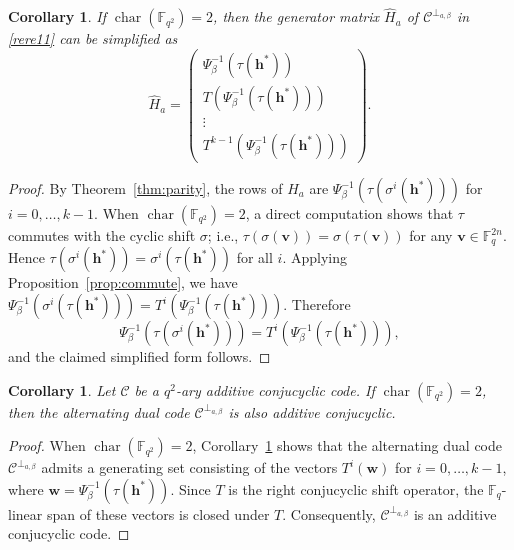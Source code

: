 \documentclass{aims}
\numberwithin{equation}{section}
\newtheorem{corollary}[theorem]{Corollary}
\theoremstyle{definition}
\newcommand{\F}{\mathbb{F}}
\newcommand{\charac}{\operatorname{char}}
\begin{document}
\begin{corollary}\label{rere113}
	If $\charac(\F_{q^2}) = 2$, then the generator matrix $\hat{H}_a$ of $\mathcal{C}^{\perp_{a,\beta}}$ in \eqref{rere11} can be simplified as
	\[
	\hat{H}_a = \begin{pmatrix}
		\Psi_\beta^{-1}(\tau(\pmb{h^*})) \\
		T(\Psi_\beta^{-1}(\tau(\pmb{h^*}))) \\
		\vdots \\
		T^{k-1}(\Psi_\beta^{-1}(\tau(\pmb{h^*})))
	\end{pmatrix}.
	\]
\end{corollary}
\begin{proof}
	By Theorem~\ref{thm:parity}, the rows of $\hat{H}_a$ are $\Psi_\beta^{-1}(\tau(\sigma^i(\pmb{h^*})))$ for $i = 0,\dots,k-1$. When $\charac(\F_{q^2}) = 2$, a direct computation shows that $\tau$ commutes with the cyclic shift $\sigma$; i.e., $\tau(\sigma(\mathbf{v})) = \sigma(\tau(\mathbf{v}))$ for any $\mathbf{v}\in\F_q^{2n}$. Hence $\tau(\sigma^i(\pmb{h^*})) = \sigma^i(\tau(\pmb{h^*}))$ for all $i$. Applying Proposition~\ref{prop:commute}, we have $\Psi_\beta^{-1}(\sigma^i(\tau(\pmb{h^*}))) = T^i(\Psi_\beta^{-1}(\tau(\pmb{h^*})))$. Therefore
	\[
	\Psi_\beta^{-1}(\tau(\sigma^i(\pmb{h^*}))) = T^i(\Psi_\beta^{-1}(\tau(\pmb{h^*}))),
	\]
	and the claimed simplified form follows.
\end{proof}

\begin{corollary}\label{cor:char2}
	Let $\mathcal{C}$ be a $q^2$-ary additive conjucyclic code. If $\charac(\F_{q^2}) = 2$, then the alternating dual code $\mathcal{C}^{\perp_{a,\beta}}$ is also additive conjucyclic.
\end{corollary}
\begin{proof}
 When $\charac(\F_{q^2}) = 2$, Corollary~\ref{rere113} shows that the alternating dual code $\mathcal{C}^{\perp_{a,\beta}}$ admits a generating set consisting of the vectors $T^i(\mathbf{w})$ for $i = 0,\dots,k-1$, where $\mathbf{w} = \Psi_\beta^{-1}(\tau(\pmb{h^*}))$. Since $T$ is the right conjucyclic shift operator, the $\F_q$-linear span of these vectors is closed under $T$. Consequently, $\mathcal{C}^{\perp_{a,\beta}}$ is an additive conjucyclic code.
\end{proof}
\end{document}
